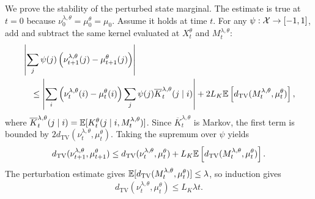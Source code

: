 We prove the stability of the perturbed state marginal. The estimate is true at $t=0$ because $\nu_0^{\lambda,\theta}=\mu_0^\theta=\mu_0$. Assume it holds at time $t$. For any $\psi:{\cal X}\to[-1,1]$, add and subtract the same kernel evaluated at $X_t^\theta$ and $M_t^{\lambda,\theta}$:
\begin{align}
    &\left|\sum_j\psi(j)\left(\nu_{t+1}^{\lambda,\theta}(j)-\mu_{t+1}^\theta(j)\right)\right|\\
    &\quad\leq
    \left|
    \sum_i\left(\nu_t^{\lambda,\theta}(i)-\mu_t^\theta(i)\right)
    \sum_j\psi(j)\overline K_t^{\lambda,\theta}(j\mid i)
    \right|
    +
    2L_K\mathbb{E}\left[d_\mathrm{TV}(M_t^{\lambda,\theta},\mu_t^\theta)\right],
\end{align}
where $\overline K_t^{\lambda,\theta}(j\mid i)=\mathbb{E}[K_t^\theta(j\mid i,M_t^{\lambda,\theta})]$. Since $\overline K_t^{\lambda,\theta}$ is Markov, the first term is bounded by $2d_\mathrm{TV}(\nu_t^{\lambda,\theta},\mu_t^\theta)$. Taking the supremum over $\psi$ yields
\begin{align}
    d_\mathrm{TV}(\nu_{t+1}^{\lambda,\theta},\mu_{t+1}^\theta)
    \leq
    d_\mathrm{TV}(\nu_t^{\lambda,\theta},\mu_t^\theta)
    +
    L_K\mathbb{E}\left[d_\mathrm{TV}(M_t^{\lambda,\theta},\mu_t^\theta)\right].
\end{align}
The perturbation estimate gives $\mathbb{E}[d_\mathrm{TV}(M_t^{\lambda,\theta},\mu_t^\theta)]\leq\lambda$, so induction gives
\begin{align}
    d_\mathrm{TV}(\nu_t^{\lambda,\theta},\mu_t^\theta)
    \leq
    L_K\lambda t.
\end{align}

